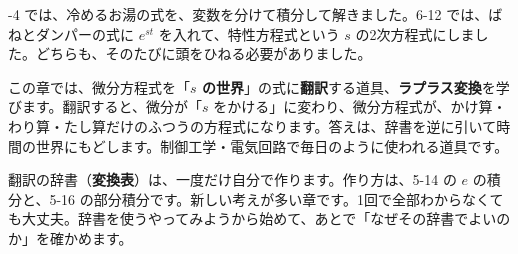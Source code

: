 -4 では、冷めるお湯の式を、変数を分けて積分して解きました。6-12 では、ばねとダンパーの式に $e^{st}$ を入れて、特性方程式という $s$ の2次方程式にしました。どちらも、そのたびに頭をひねる必要がありました。

この章では、微分方程式を「\textbf{$s$ の世界}」の式に\textbf{翻訳}する道具、\textbf{ラプラス変換}を学びます。翻訳すると、微分が「$s$ をかける」に変わり、微分方程式が、かけ算・わり算・たし算だけのふつうの方程式になります。答えは、辞書を逆に引いて時間の世界にもどします。制御工学・電気回路で毎日のように使われる道具です。

翻訳の辞書（\textbf{変換表}）は、一度だけ自分で作ります。作り方は、5-14 の $e$ の積分と、5-16 の部分積分です。新しい考えが多い章です。1回で全部わからなくても大丈夫。辞書を使うやってみようから始めて、あとで「なぜその辞書でよいのか」を確かめます。

\begin{omoidasou}
\end{omoidasou}

